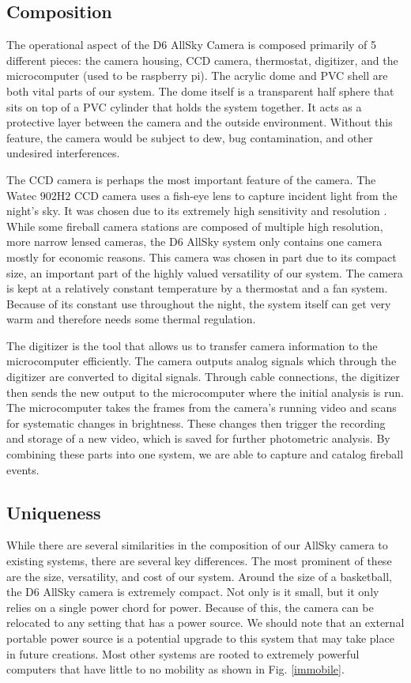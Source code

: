 \subsection{Composition}

The operational aspect of the D6 AllSky Camera is composed primarily of 5 different pieces: the camera housing, CCD camera, thermostat, digitizer, and the microcomputer (used to be raspberry pi).
The acrylic dome and PVC shell are both vital parts of our system. 
The dome itself is a transparent half sphere that sits on top of a PVC cylinder that holds the system together.
It acts as a protective layer between the camera and the outside environment.  
Without this feature, the camera would be subject to dew, bug contamination, and other undesired interferences.

The CCD camera is perhaps the most important feature of the camera.  
The Watec $902$H$2$ CCD camera uses a fish-eye lens to capture incident light from the night's sky.  
It was chosen due to its extremely high sensitivity and resolution \cite{mcswain_using_2016}.
While some fireball camera stations are composed of multiple high resolution, more narrow lensed cameras, the D6 AllSky system only contains one camera mostly for economic reasons.  
This camera was chosen in part due to its compact size, an important part of the highly valued versatility of our system. 
The camera is kept at a relatively constant temperature by a thermostat and a fan system. 
Because of its constant use throughout the night, the system itself can get very warm and therefore needs some thermal regulation.

The digitizer is the tool that allows us to transfer camera information to the microcomputer efficiently.  
The camera outputs analog signals which through the digitizer are converted to digital signals.
Through cable connections, the digitizer then sends the new output to the microcomputer where the initial analysis is run. 
The microcomputer takes the frames from the camera's running video and scans for systematic changes in brightness.
These changes then trigger the recording and storage of a new video, which is saved for further photometric analysis.
By combining these parts into one system, we are able to capture and catalog fireball events.

\subsection{Uniqueness}

While there are several similarities in the composition of our AllSky camera to existing systems, there are several key differences.
The most prominent of these are the size, versatility, and cost of our system.
Around the size of a basketball, the D6 AllSky camera is extremely compact.  
Not only is it small, but it only relies on a single power chord for power.  
Because of this, the camera can be relocated to any setting that has a power source.  
We should note that an external portable power source is a potential upgrade to this system that may take place in future creations.
Most other systems are rooted to extremely powerful computers that have little to no mobility as shown in Fig. \ref{immobile}.

